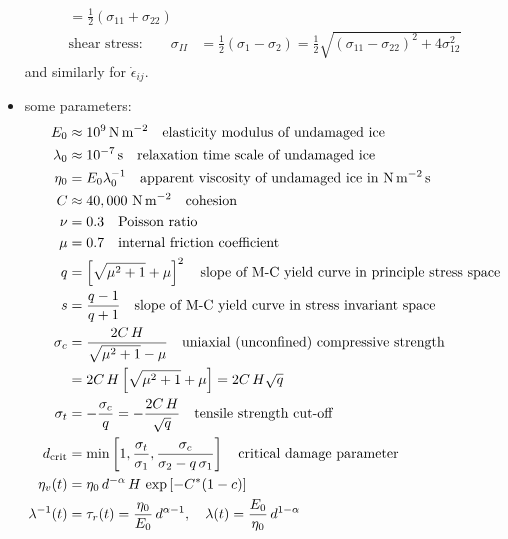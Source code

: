 \documentclass[12pt]{article}
\newcommand{\sr}{\dot{\epsilon}}
\begin{document}
\begin{itemize}
\begin{align}
             = \frac{1}{2}\left(\sigma_{11}+\sigma_{22}\right)\\
    \text{shear stress:}\qquad\sigma_{II}
           &= \frac{1}{2}\left(\sigma_1-\sigma_2\right)
             =  \frac{1}{2}\sqrt{(\sigma_{11}-\sigma_{22})^2+4\sigma_{12}^{2}}
  \end{align}
  and similarly for $\sr_{ij}$.
\item some parameters:
  \begin{alignat}{1}
    E_0&\approx 10^{9}\text{\,N\,m$^{-2}$}
    \quad\text{elasticity modulus of undamaged ice} \\
    \lambda_{0} &\approx 10^{-7}\text{\,s}
    \quad\text{relaxation time scale of undamaged ice} \\
    \eta_0&= E_0\lambda_{0}^{-1}
    \quad\text{apparent viscosity of undamaged ice in N\,m$^{-2}$\,s} \\
    C   &\approx 40,000\text{ N\,m$^{-2}$} \quad\text{cohesion}\\
    \nu &= 0.3 \quad\text{Poisson ratio}\\
    \mu &= 0.7 \quad\text{internal friction coefficient} \\
    q &= \left[\sqrt{\mu^{2}+1}+\mu\right]^{2}
    \quad\text{slope of M-C yield curve in principle stress space}\\
    s &= \frac{q-1}{q+1}
    \quad\text{slope of M-C yield curve in stress invariant space}\\
    \sigma_c &=\frac{2C\,H}{\sqrt{\mu^{2}+1}-\mu}
    \quad\text{uniaxial (unconfined) compressive strength}  \\
    &= 2C\,H\left[\sqrt{\mu^{2}+1}+\mu\right]
    =2C\,H\sqrt{q} \nonumber \\
    \sigma_t&=-\frac{\sigma_c}{q} = -\frac{2C\,H}{\sqrt{q}}
    \quad\text{tensile strength cut-off}\\
    d_{\mathrm{crit}} &= \min\left[1, \frac{\sigma_t}{\sigma_1},
      \frac{\sigma_c}{\sigma_2-q\,\sigma_1}\right]
    \quad\text{critical damage parameter} \\
    \eta_v(t) &= \eta_0\, d^{-\alpha}\,H\,\exp\left[-C^*(1-c)\right] \\
    \lambda^{-1}(t) &= \tau_r(t) = \frac{\eta_0}{E_0}\,d^{\alpha-1}, \quad
    \lambda(t) = \frac{E_0}{\eta_0}\,d^{1-\alpha}
  \end{alignat}


\end{itemize}
\end{document}
